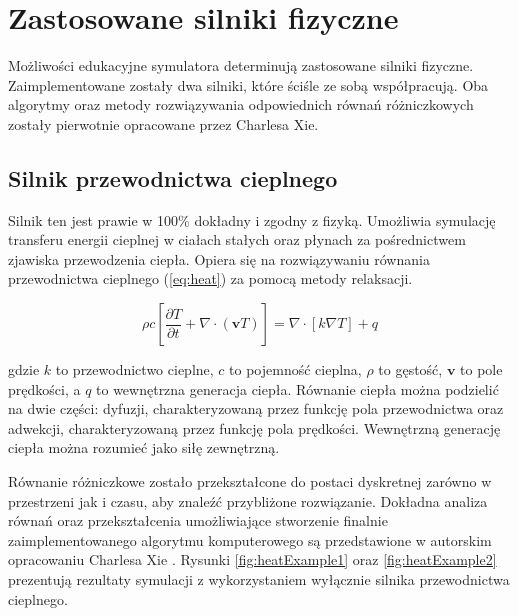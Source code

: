 \section{Zastosowane silniki fizyczne}
\label{sec:silnikiFizyczne}

Możliwości edukacyjne symulatora \en determinują zastosowane silniki fizyczne.
Zaimplementowane zostały dwa silniki, które ściśle ze sobą współpracują. Oba
algorytmy oraz metody rozwiązywania odpowiednich równań różniczkowych  zostały
pierwotnie opracowane przez Charlesa Xie.

\subsection{Silnik przewodnictwa cieplnego}

Silnik ten jest prawie w 100\% dokładny i zgodny z fizyką. Umożliwia symulację
transferu energii cieplnej w ciałach stałych oraz płynach za pośrednictwem
zjawiska przewodzenia ciepła. Opiera się na rozwiązywaniu równania przewodnictwa
cieplnego (\ref{eq:heat}) za pomocą metody relaksacji.

\begin{equation}
\label{eq:heat}
\rho c \left[ \frac{\partial T}{\partial t} + \nabla \cdot (\mathbf{v}T) \right] 
= \nabla \cdot [k \nabla T] + q
\end{equation}

gdzie $k$ to przewodnictwo cieplne, $c$ to pojemność cieplna, $\rho$ to gęstość,
$\mathbf{v}$ to pole prędkości, a $q$ to wewnętrzna generacja ciepła. Równanie
ciepła można podzielić na dwie części: dyfuzji, charakteryzowaną przez funkcję
pola przewodnictwa oraz adwekcji, charakteryzowaną przez funkcję pola prędkości.
Wewnętrzną generację ciepła można rozumieć jako siłę zewnętrzną.

Równanie różniczkowe zostało przekształcone do postaci dyskretnej zarówno w
przestrzeni jak i czasu, aby znaleźć przybliżone rozwiązanie. Dokładna analiza
równań oraz przekształcenia umożliwiające stworzenie finalnie zaimplementowanego
algorytmu komputerowego są przedstawione w autorskim opracowaniu Charlesa Xie
\cite{heatEquation}. Rysunki \ref{fig:heatExample1} oraz \ref{fig:heatExample2}
prezentują rezultaty symulacji z wykorzystaniem wyłącznie silnika
przewodnictwa cieplnego.

